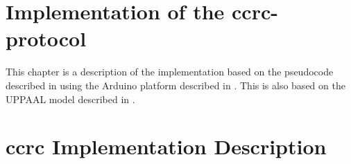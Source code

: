 \section{Implementation of the \acrshort{ccrc}-protocol}
This chapter is a description of the implementation based on the pseudocode described in  using the Arduino platform described in . 
This is also based on the UPPAAL model described in .
\section{\acrshort{ccrc} Implementation Description}


